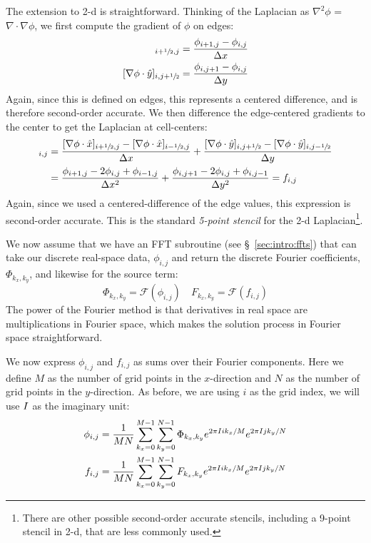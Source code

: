 The extension to 2-d is straightforward.  Thinking of the Laplacian as $\nabla^2
\phi$ = $\nabla \cdot \nabla \phi$, we first compute the gradient of
$\phi$ on edges:
\begin{align}
[\nabla \phi \cdot \hat{x}]_{i+\myhalf,j} &= \frac{\phi_{i+1,j} - \phi_{i,j}}{\dx} \\
[\nabla \phi \cdot \hat{y}]_{i,j+\myhalf} &= \frac{\phi_{i,j+1} - \phi_{i,j}}{\dy} 
\end{align}
Again, since this is defined on edges, this represents a centered
difference, and is therefore second-order accurate.  We then
difference the edge-centered gradients to the center to get the
Laplacian at cell-centers:
\begin{align}
[\nabla^2 \phi]_{i,j} &=
   \frac{[\nabla \phi \cdot \hat{x}]_{i+\myhalf,j} -
         [\nabla \phi \cdot \hat{x}]_{i-\myhalf,j}}{\dx} +
   \frac{[\nabla \phi \cdot \hat{y}]_{i,j+\myhalf} -
         [\nabla \phi \cdot \hat{y}]_{i,j-\myhalf}}{\dy} \nonumber\\
%
  &= \frac{\phi_{i+1,j} - 2\phi_{i,j} + \phi_{i-1,j}}{\dx^2} +
     \frac{\phi_{i,j+1} - 2\phi_{i,j} + \phi_{i,j-1}}{\dy^2} = f_{i,j}
\end{align}        
Again, since we used a centered-difference of the edge values, this
expression is second-order accurate.  This is the standard {\em
  5-point stencil} for the 2-d Laplacian\footnote{There are other
  possible second-order accurate stencils, including a 9-point stencil
  in 2-d, that are less commonly used.}.

We now assume that we have an FFT subroutine (see
\S~\ref{sec:intro:ffts}) that can take our discrete real-space data,
$\phi_{i,j}$ and return the discrete Fourier coefficients,
$\Phi_{k_x,k_y}$, and likewise for the source term:
\begin{equation}
\Phi_{k_x,k_y} = \mathcal{F}(\phi_{i,j}) \quad
F_{k_x,k_y} = \mathcal{F}(f_{i,j})
\end{equation}
The power of the Fourier method is that derivatives in real space are
multiplications in Fourier space, which makes the solution process in
Fourier space straightforward.

We now express $\phi_{i,j}$ and $f_{i,j}$ as sums over their Fourier
components.  Here we define $M$ as the number of grid points in the
$x$-direction and $N$ as the number of grid points in the
$y$-direction.  As before, we are using $i$ as the grid index, we
will use $I$ as the imaginary unit:
\begin{align}
\phi_{i,j} &= \frac{1}{MN} \sum_{k_x = 0}^{M-1} \sum_{k_y = 0}^{N-1}
  \Phi_{k_x,k_y} e^{2\pi I i k_x/M} e^{2\pi I j k_y/N} \\
f_{i,j} &= \frac{1}{MN} \sum_{k_x = 0}^{M-1} \sum_{k_y = 0}^{N-1}
  F_{k_x,k_y} e^{2\pi I i k_x/M} e^{2\pi I j k_y/N} 
\end{align}

